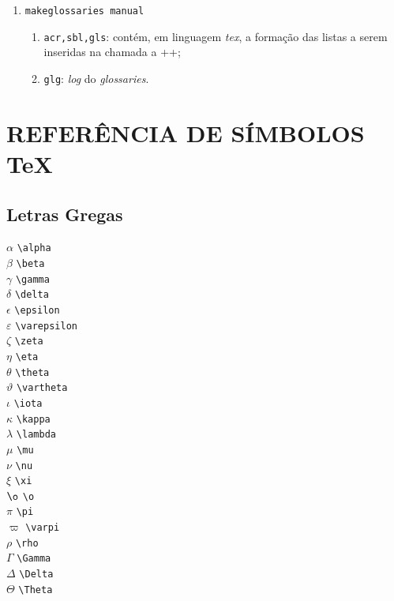 \documentclass[xindy,rascunho]{fei}
\begin{document}
\begin{teorema}
\begin{enumerate}
	\item\verb+makeglossaries manual+
	\begin{enumerate}
	\item \texttt{acr,sbl,gls}:  contém, em linguagem \emph{tex}, a formação das listas a serem inseridas na chamada a \latexinline+\printglossaries+;
	\item \texttt{glg}: \emph{log} do \emph{glossaries}.
	\end{enumerate}
	\end{enumerate}
	
	\chapter{REFERÊNCIA DE SÍMBOLOS \TeX{}} \label{chap:simbolos}

\section{Letras Gregas}
\begin{multicols}{3}
\noindent
\(\alpha\) \verb+\alpha+\\
\(\beta\) \verb+\beta+\\
\(\gamma\) \verb+\gamma+\\
\(\delta\) \verb+\delta+\\
\(\epsilon\) \verb+\epsilon+\\
\(\varepsilon\) \verb+\varepsilon+\\
\(\zeta\) \verb+\zeta+\\
\(\eta\) \verb+\eta+\\
\(\theta\) \verb+\theta+\\
\(\vartheta\) \verb+\vartheta+\\
\(\iota\) \verb+\iota+\\
\(\kappa\) \verb+\kappa+\\
\(\lambda\) \verb+\lambda+\\
\(\mu\) \verb+\mu+\\
\(\nu\) \verb+\nu+\\
\(\xi\) \verb+\xi+\\
\(\o\) \verb+\o+\\
\(\pi\) \verb+\pi+\\
\(\varpi\) \verb+\varpi+\\
\(\rho\) \verb+\rho+\\
\(\Gamma\) \verb+\Gamma+\\
\(\Delta\) \verb+\Delta+\\
\(\Theta\) \verb+\Theta+\\

\end{multicols}
\end{teorema}
\end{document}
